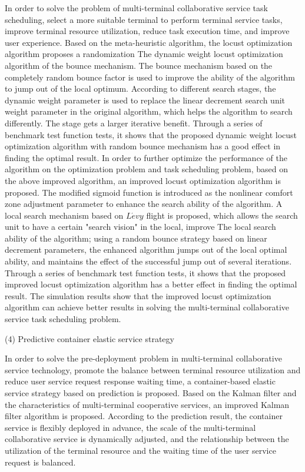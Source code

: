 In order to solve the problem of multi-terminal collaborative service task scheduling, select a more suitable terminal to perform terminal service tasks, improve terminal resource utilization, reduce task execution time, and improve user experience. Based on the meta-heuristic algorithm, the locust optimization algorithm proposes a randomization The dynamic weight locust optimization algorithm of the bounce mechanism. The bounce mechanism based on the completely random bounce factor is used to improve the ability of the algorithm to jump out of the local optimum. According to different search stages, the dynamic weight parameter is used to replace the linear decrement search unit weight parameter in the original algorithm, which helps the algorithm to search differently. The stage gets a larger iterative benefit. Through a series of benchmark test function tests, it shows that the proposed dynamic weight locust optimization algorithm with random bounce mechanism has a good effect in finding the optimal result. In order to further optimize the performance of the algorithm on the optimization problem and task scheduling problem, based on the above improved algorithm, an improved locust optimization algorithm is proposed. The modified sigmoid function is introduced as the nonlinear comfort zone adjustment parameter to enhance the search ability of the algorithm. A local search mechanism based on $L\acute{e}vy$ flight is proposed, which allows the search unit to have a certain "search vision" in the local, improve The local search ability of the algorithm; using a random bounce strategy based on linear decrement parameters, the enhanced algorithm jumps out of the local optimal ability, and maintains the effect of the successful jump out of several iterations. Through a series of benchmark test function tests, it shows that the proposed improved locust optimization algorithm has a better effect in finding the optimal result. The simulation results show that the improved locust optimization algorithm can achieve better results in solving the multi-terminal collaborative service task scheduling problem.

(4) Predictive container elastic service strategy

In order to solve the pre-deployment problem in multi-terminal collaborative service technology, promote the balance between terminal resource utilization and reduce user service request response waiting time, a container-based elastic service strategy based on prediction is proposed. Based on the Kalman filter and the characteristics of multi-terminal cooperative services, an improved Kalman filter algorithm is proposed. According to the prediction result, the container service is flexibly deployed in advance, the scale of the multi-terminal collaborative service is dynamically adjusted, and the relationship between the utilization of the terminal resource and the waiting time of the user service request is balanced.


